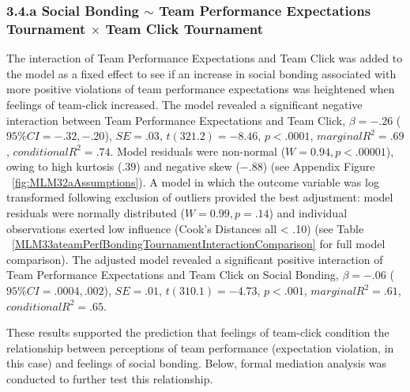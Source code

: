  

 




\subsubsection{3.4.a Social Bonding $\sim$ Team Performance Expectations Tournament $\times$ Team Click Tournament}

 The interaction of Team Performance Expectations and Team Click was added to the model as a fixed effect to see if an increase in social bonding associated with more positive violations of team performance expectations was heightened when feelings of team-click increased. The model revealed a significant negative interaction between Team Performance Expectations and Team Click,  $\beta = -.26$ ($95\% CI =  -.32, -.20$), $SE = .03$, $t(321.2) = -8.46$, $p < .0001$, $marginal R^2 = .69$, $conditional R^2 = .74$.  Model residuals were non-normal ($W = 0.94, p < .00001$), owing to high kurtosis ($.39$) and negative skew ($-.88$) (see Appendix Figure ~\ref{fig:MLM32aAssumptions}).
 A model in which the outcome variable was log transformed following exclusion of outliers provided the best adjustment: model residuals were normally distributed ($W = 0.99, p = .14$) and individual observations exerted low influence (Cook's Distances all < .10) (see Table ~\ref{MLM33ateamPerfBondingTournamentInteractionComparison} for full model comparison). The adjusted model revealed a significant positive interaction of Team Performance Expectations and Team Click on Social Bonding, $\beta = -.06$ ($95\% CI =  .0004, .002$), $SE = .01$, $t(310.1) = -4.73$, $p < .001$, $marginal R^2 = .61$, $conditional R^2 = .65$.

 These results supported the prediction that feelings of team-click condition the relationship between perceptions of team performance (expectation violation, in this case) and feelings of social bonding.  Below, formal mediation analysis was conducted to further test this relationship.


 













